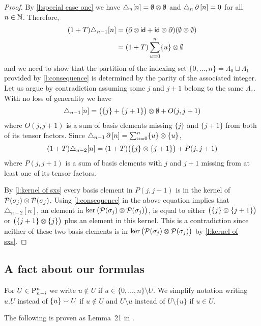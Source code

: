 \begin{proof}
	By \cref{l:special case one} we have $\triangle_{n} [n] = \emptyset \ot \emptyset$ and $\triangle_{n} \bd \, [n] = 0$ for all $n \in \N$.
	Therefore,
	\begin{align*}
	(1+T) \triangle_{n-1} [n] &=
	(\bd \ot \, \id + \id \ot \bd) (\emptyset \ot \emptyset) \\ &=
	(1+T) \sum_{u=0}^n \{u\} \ot \emptyset
	\end{align*}
	and we need to show that the partition of the indexing set $\{0, \dots, n\} = \Lambda_0 \sqcup \Lambda_1$ provided by \cref{l:consequence} is determined by the parity of the associated integer.
	Let us argue by contradiction assuming some $j$ and $j+1$ belong to the same $\Lambda_{\varepsilon}$.
	With no loss of generality we have
	\[
	\triangle_{n-1} [n] = \big( \{j\} + \{j+1\} \big) \ot \emptyset + O(j, j+1)
	\]
	where $O(j, j+1)$ is a sum of basis elements missing $\{j\}$ and $\{j+1\}$ from both of its tensor factors.
	Since $\triangle_{n-1} \bd \, [n] = \sum_{u=0}^{n} \{u\} \ot \{u\}$,
	\[
	(1+T) \triangle_{n-2} [n] = (1+T) \big( \{j\} \ot \{j+1\} \big) + P(j, j+1)
	\]
	where $P(j, j+1)$ is a sum of basis elements with $j$ and $j+1$ missing from at least one of its tensor factors.

	By \cref{l:kernel of sxs} every basis element in $P(j,j+1)$ is in the kernel of $\cP(\sigma_j) \ot \cP(\sigma_j)$.
	Using \cref{l:consequence} in the above equation implies that $\triangle_{n-2} [n]$, an element in $\ker \big( \cP(\sigma_j) \ot \cP(\sigma_j) \big)$, is equal to either $\big( \{j\} \ot \{j+1\} \big)$ or $\big( \{j+1\} \ot \{j\} \big)$ plus an element in this kernel.
	This is a contradiction since neither of these two basis elements is in $\ker \big( \cP(\sigma_j) \ot \cP(\sigma_j) \big)$ by \cref{l:kernel of sxs}.
\end{proof}

\subsection{A fact about our formulas} \label{ss:fact}

\begin{notation*}
	For $U \in \P_{n-i}^n$ we write $u \notin U$ if $u \in \{0, \dots, n\} \setminus U$.
	We simplify notation writing $u.U$ instead of $\{u\} \union U$ if $u \notin U$ and $U \setminus u$ instead of $U \setminus \{u\}$ if $u \in U$.
\end{notation*}

The following is proven as Lemma~21 in \cite{medina2021fast_sq}.

